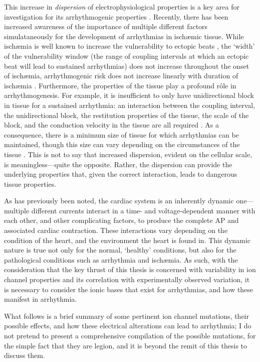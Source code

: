 \documentclass[../thesis-main.tex]{subfiles}
\begin{document}
This increase in \emph{dispersion} of electrophysiological properties is a key area for investigation for its arrhythmogenic properties \citep{Kuo1983}. Recently, there has been increased awareness of the importance of multiple different factors simulataneously for the development of arrhythmias in isch\ae{}mic tissue. While isch\ae{}mia is well known to increase the vulnerability to ectopic beats \citep{Zhang2011}, the `width' of the vulnerability window (the range of coupling intervals at which an ectopic beat will lead to sustained arrhythmias) does not increase throughout the onset of isch\ae{}mia, \idest{} arrhythmogenic risk does not increase linearly with duration of isch\ae{}mia \citep{Tice2007, Romero2009a, Barrett1997}. Furthermore, the properties of the tissue play a profound r\^ole in arrhythmogenesis. For example, it is insufficient to only have unidirectional block in tissue for a sustained arrhythmia: an interaction between the coupling interval, the unidirectional block, the restitution properties of the tissue, the scale of the block, and the conduction velocity in the tissue are all required \citep{Coronel2009, Cherry2012}. As a consequence, there is a minimum size of tissue for which arrhythmias can be maintained, though this size can vary depending on the circumstances of the tissue \citep{Adeniran2011}. This is not to say that increased dispersion, evident on the cellular scale, is meaningless---quite the opposite. Rather, the dispersion can provide the underlying properties that, given the correct interaction, leads to dangerous tissue properties.

As has previously been noted, the cardiac system is an inherently dynamic one---multiple different currents interact in a time- and voltage-dependent manner with each other, and other complicating factors, to produce the complete AP and associated cardiac contraction. These interactions vary depending on the condition of the heart, and the environment the heart is found in. This dynamic nature is true not only for the normal, `healthy' conditions, but also for the pathological conditions such as arrhythmia and isch\ae{}mia. As such, with the consideration that the key thrust of this thesis is concerned with variability in ion channel properties and its correlation with experimentally observed variation, it is necessary to consider the ionic bases that exist for arrhythmias, and how these manifest in arrhythmia.

What follows is a brief summary of some pertinent ion channel mutations, their possible effects, and how these electrical alterations can lead to arrhythmia; I do not pretend to present a comprehensive compilation of the possible mutations, for the simple fact that they are legion, and it is beyond the remit of this thesis to discuss them.
\end{document}
